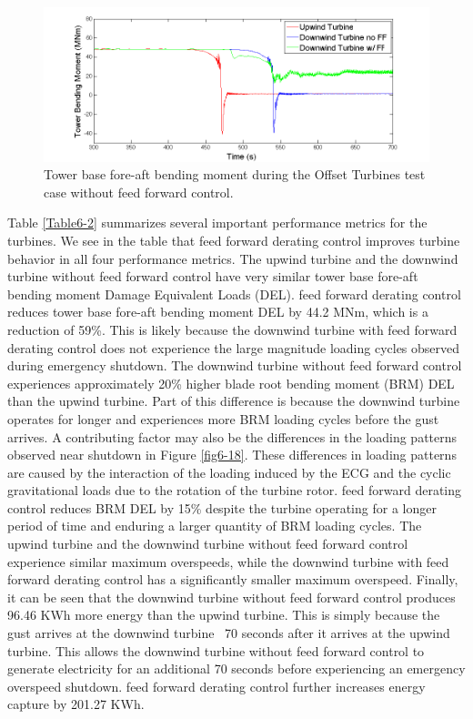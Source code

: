 \begin{figure}[ht] 
	\centering
		\includegraphics[width = \linewidth]{Figures/ch6Figures/fig6-19.png}

	\caption{Tower base fore-aft bending moment during the Offset Turbines test case without feed forward control.}
	\label{fig6-19}
\end{figure}

Table \ref{Table6-2} summarizes several important performance metrics for the turbines. We see in the table that feed forward derating control improves turbine behavior in all four performance metrics. The upwind turbine and the downwind turbine without feed forward control have very similar tower base fore-aft bending moment Damage Equivalent Loads (DEL). feed forward derating control reduces tower base fore-aft bending moment DEL by 44.2 MNm, which is a reduction of 59\%. This is likely because the downwind turbine with feed forward derating control does not experience the large magnitude loading cycles observed during emergency shutdown. The downwind turbine without feed forward control experiences approximately 20\% higher blade root bending moment (BRM) DEL than the upwind turbine. Part of this difference is because the downwind turbine operates for longer and experiences more BRM loading cycles before the gust arrives. A contributing factor may also be the differences in the loading patterns observed near shutdown in Figure \ref{fig6-18}. These differences in loading patterns are caused by the interaction of the loading induced by the ECG and the cyclic gravitational loads due to the rotation of the turbine rotor. feed forward derating control reduces BRM DEL by 15\% despite the turbine operating for a longer period of time and enduring a larger quantity of BRM loading cycles. The upwind turbine and the downwind turbine without feed forward control experience similar maximum overspeeds, while the downwind turbine with feed forward derating control has a significantly smaller maximum overspeed. Finally, it can be seen that the downwind turbine without feed forward control produces 96.46 KWh more energy than the upwind turbine. This is simply because the gust arrives at the downwind turbine ~70 seconds after it arrives at the upwind turbine. This allows the downwind turbine without feed forward control to generate electricity for an additional 70 seconds before experiencing an emergency overspeed shutdown. feed forward derating control further increases energy capture by 201.27 KWh.




